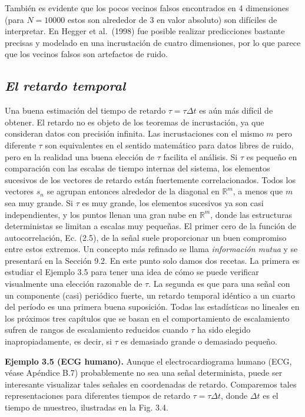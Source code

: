 \documentclass[10pt,a4paper]{book}
\begin{document}
También es evidente que los pocos vecinos falsos encontrados en 4 dimensiones (para $N=10000$ estos son alrededor de 3 en valor absoluto) son difíciles de interpretar. En Hegger et al.\ (1998) fue posible realizar predicciones bastante precisas y modelado en una incrustación de cuatro dimensiones, por lo que parece que los vecinos falsos son artefactos de ruido.

\newpage

\subsection{\textit{El retardo temporal}}

Una buena estimación del tiempo de retardo $\tau = \tau \Delta t$ es aún más difícil de obtener. 
El retardo no es objeto de los teoremas de incrustación, ya que consideran datos con precisión infinita. 
Las incrustaciones con el mismo $m$ pero diferente $\tau$ son equivalentes en el sentido matemático para datos libres de ruido, 
pero en la realidad una buena elección de $\tau$ facilita el análisis. 
Si $\tau$ es pequeño en comparación con las escalas de tiempo internas del sistema, 
los elementos sucesivos de los vectores de retardo están fuertemente correlacionados. 
Todos los vectores $s_n$ se agrupan entonces alrededor de la diagonal en $\mathbb{R}^m$, 
a menos que $m$ sea muy grande. 
Si $\tau$ es muy grande, los elementos sucesivos ya son casi independientes, 
y los puntos llenan una gran nube en $\mathbb{R}^m$, donde las estructuras deterministas se limitan a escalas muy pequeñas. 
El primer cero de la función de autocorrelación, Ec. (2.5), de la señal suele proporcionar un buen compromiso entre estos extremos. 
Un concepto más refinado se llama \textit{información mutua} y se presentará en la Sección 9.2. 
En este punto solo damos dos recetas. 
La primera es estudiar el Ejemplo 3.5 para tener una idea de cómo se puede verificar visualmente una elección razonable de $\tau$. 
La segunda es que para una señal con un componente (casi) periódico fuerte, un retardo temporal idéntico a un cuarto del período es una primera buena suposición. 
Todas las estadísticas no lineales en los próximos tres capítulos que se basan en el comportamiento de escalamiento sufren de rangos de escalamiento reducidos cuando $\tau$ ha sido elegido inapropiadamente, es decir, si $\tau$ es demasiado grande o demasiado pequeño. 

\bigskip

\textbf{Ejemplo 3.5 (ECG humano).} 
Aunque el electrocardiograma humano (ECG, véase Apéndice B.7) probablemente no sea una señal determinista, puede ser interesante visualizar tales señales en coordenadas de retardo. 
Comparemos tales representaciones para diferentes tiempos de retardo $\tau = \tau \Delta t$, donde $\Delta t$ es el tiempo de muestreo, ilustradas en la Fig. 3.4.
\end{document}
